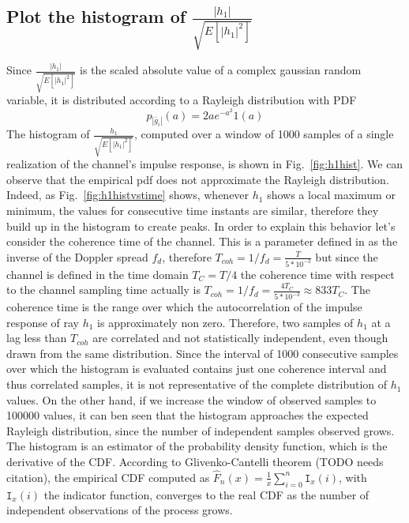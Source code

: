 \documentclass[10pt]{article}
\begin{document}
\subsection*{Plot the histogram of $\frac{|h_1|}{\sqrt{E[|h_1|^2]}}$}
Since $\frac{|h_1|}{\sqrt{E[|h_1|^2]}}$ is the scaled absolute value of a complex gaussian random variable, it is distributed according to a Rayleigh distribution with PDF
\begin{equation}
  p_{|\bar{g}_i|}(a) = 2a e^{-a^2} 1(a)
\end{equation}
The histogram of $\frac{h_1}{\sqrt{E[|h_1|^2]}}$, computed over a window of 1000 samples of a single realization of the channel's impulse response, is shown in Fig.~\ref{fig:h1hist}. We can observe that the empirical pdf does not approximate the Rayleigh distribution. Indeed, as Fig.~\ref{fig:h1histvstime} shows, whenever $h_1$ shows a local maximum or minimum, the values for consecutive time instants are similar, therefore they build up in the histogram to create peaks. In order to explain this behavior let's consider the coherence time of the channel. This is a parameter defined in \cite{bc} as the inverse of the Doppler spread $f_d$, therefore $T_{coh} = 1/f_d = \frac{T}{5*10^{-3}}$ but since the channel is defined in the time domain $T_C = T/4$ the coherence time with respect to the channel sampling time actually is $T_{coh} = 1/f_d = \frac{4T_C}{5*10^{-3}} \approx 833T_C$.
The coherence time is the range over which the autocorrelation of the impulse response of ray $h_1$ is approximately non zero. Therefore, two samples of $h_1$ at a lag less than $T_{coh}$ are correlated and not statistically independent, even though drawn from the same distribution. Since the interval of 1000 consecutive samples over which the histogram is evaluated contains just one coherence interval and thus correlated samples, it is not representative of the complete distribution of $h_1$ values. On the other hand, if we increase the window of observed samples to 100000 values, it can ben seen that the histogram approaches the expected Rayleigh distribution, since the number of independent samples observed grows. The histogram is an estimator of the probability density function, which is the derivative of the CDF. According to Glivenko-Cantelli theorem (TODO needs citation), the empirical CDF computed as $\hat{F}_n(x) = \frac{1}{x}\sum_{i = 0}^n \texttt{I}_x(i)$, with $\texttt{I}_x(i)$ the indicator function, converges to the real CDF as the number of independent observations of the process grows.
\end{document}
